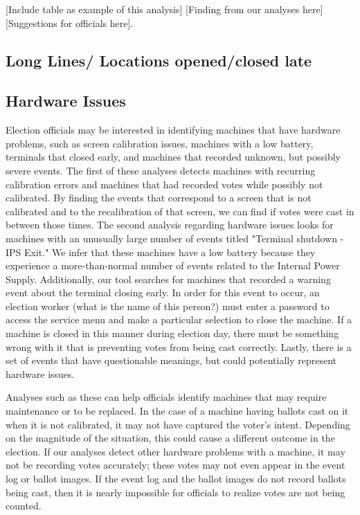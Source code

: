 [Include table as example of this analysis] [Finding from our analyses here] [Suggestions for officials here].

\subsection{Long Lines/ Locations opened/closed late}

\subsection{Hardware Issues}
Election officials may be interested in identifying machines that have hardware problems, such as screen calibration issues, machines with a low battery, terminals that closed early, and machines that recorded unknown, but possibly severe events.  The first of these analyses detects machines with recurring calibration errors and machines that had recorded votes while possibly not calibrated.  By finding the events that correspond to a screen that is not calibrated and to the recalibration of that screen, we can find if votes were cast in between those times.  The second analysis regarding hardware issues looks for machines with an unusually large number of events titled "Terminal shutdown - IPS Exit."  We infer that these machines have a low battery because they experience a more-than-normal number of events related to the Internal Power Supply.  Additionally, our tool searches for machines that recorded a warning event about the terminal closing early.  In order for this event to occur, an election worker (what is the name of this person?) must enter a password to access the service menu and make a particular selection to close the machine.  If a machine is closed in this manner during election day, there must be something wrong with it that is preventing votes from being cast correctly.  Lastly, there is a set of events that have questionable meanings, but could potentially represent hardware issues.   

Analyses such as these can help officials identify machines that may require maintenance or to be replaced.  In the case of a machine having ballots cast on it when it is not calibrated, it may not have captured the voter's intent.  Depending on the magnitude of the situation, this could cause a different outcome in the election.  If our analyses detect other hardware problems with a machine, it may not be recording votes accurately; these votes may not even appear in the event log or ballot images.  If the event log and the ballot images do not record ballots being cast, then it is nearly impossible for officials to realize votes are not being counted.    

